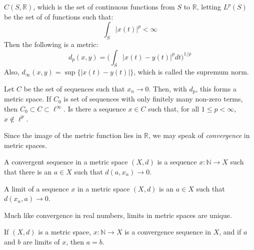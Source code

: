\documentclass[crop=false,class=book,oneside]{standalone}
\begin{document}
            \begin{example}
                $C(S,\mathbb{R})$, which is the
                set of continuous functions from
                $S$ to $\mathbb{R}$, letting
                $L^{p}(S)$ be the set of of functions
                such that:
                \begin{equation*}
                    \int_{S}|x(t)|^{p}<\infty
                \end{equation*}
                Then the following is a metric:
                \begin{equation*}
                    d_{p}(x,y)=
                    \bigg(
                        \int_{S}|x(t)-y(t)|^{p}dt
                    \bigg)^{1/p}
                \end{equation*}
                Also,
                $d_{\infty}(x,y)=\sup\{|x(t)-y(t)|\}$,
                which is called the supremum norm.
            \end{example}
            \begin{example}
                Let $C$ be the set of sequences such that
                $x_{n}\rightarrow{0}$. Then, with
                $d_{p}$, this forms a metric space.
                If $C_{0}$ is set of sequences with
                only finitely many non-zero terms,
                then
                $C_{0}\subset{C}\subset{\ell^{\infty}}$.
                Is there a sequence $x\in{C}$ such
                that, for all $1\leq{p}<\infty$,
                $x\notin{\ell^{p}}$.
            \end{example}
            Since the image of the metric function
            lies in $\mathbb{R}$,
            we may speak of \textit{convergence}
            in metric spaces.
            \begin{definition}
                A convergent sequence in a metric space
                $(X,d)$ is a sequence
                $x:\mathbb{N}\rightarrow{X}$ such that there
                is an $a\in{X}$ such that
                $d(a,x_{n})\rightarrow{0}$.
            \end{definition}
            \begin{definition}
                A limit of a sequence
                $x$ in a metric space $(X,d)$ is an
                $a\in{X}$ such that
                $d(x_{n},a)\rightarrow{0}$.
            \end{definition}
            Much like convergence in real numbers, limits
            in metric spaces are unique.
            \begin{theorem}
                \label{thm:Funct:Limit_of_Metric_Sequence_Unique}
                If $(X,d)$ is a metric space,
                $x:\mathbb{N}\rightarrow{X}$
                is a convergence sequence in $X$,
                and if $a$ and $b$ are limits of $x$,
                then $a=b$.
            \end{theorem}
\end{document}
